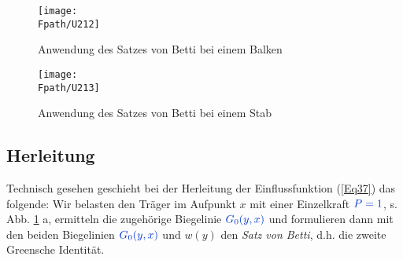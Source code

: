\begin{figure}[tbp]
\centering
\if {} \sidecaption \fi
\texttt{[image: \\Fpath/U212]}
\caption{Anwendung des Satzes von Betti bei einem Balken} \label{U212}
%
\end{figure}%

\begin{figure}[tbp]
\centering
\if {} \sidecaption \fi
\texttt{[image: \\Fpath/U213]}
\caption{Anwendung des Satzes von Betti bei einem Stab} \label{U213}
%
\end{figure}%
{\textcolor{sectionTitleBlue}{\subsection{Herleitung}}}

Technisch gesehen geschieht bei der Herleitung der Einflussfunktion (\ref{Eq37}) das folgende: Wir belasten den Tr\"{a}ger im Aufpunkt $x$ mit einer Einzelkraft $\textcolor{chapterTitleBlue}{P = 1} $, s. Abb. \ref{U212} a, ermitteln die zugeh\"{o}rige Biegelinie $\textcolor{chapterTitleBlue}{G_0(y,x)}$ und
formulieren dann mit den beiden Biegelinien $\textcolor{chapterTitleBlue}{G_0(y,x)}$ und $w(y)$ den {\em Satz von Betti\/}, d.h. die zweite Greensche Identit\"{a}t.

